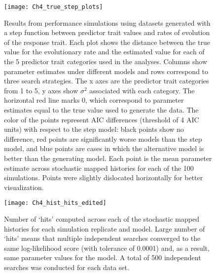\begin{figure}[hp]
	\centering
	\texttt{[image: Ch4\_true\_step\_plots]}
	\caption[Results from performance simulations using datasets generated with a step function between predictor trait values and rates of evolution of the response trait.]{Results from performance simulations using datasets generated with a step function between predictor trait values and rates of evolution of the response trait. Each plot shows the distance between the true value for the evolutionary rate and the estimated value for each of the 5 predictor trait categories used in the analyses. Columns show parameter estimates under different models and rows correspond to three search strategies. The x axes are the predictor trait categories from 1 to 5, y axes show $\sigma^{2}$ associated with each category. The horizontal red line marks 0, which correspond to parameter estimates equal to the true value used to generate the data. The color of the points represent AIC differences (threshold of 4 AIC units) with respect to the step model: black points show no difference, red points are significantly worse models than the step model, and blue points are cases in which the alternative model is better than the generating model. Each point is the mean parameter estimate across stochastic mapped histories for each of the 100 simulations. Points were slightly dislocated horizontally for better visualization.}
	\label{fig:chart_step}
\end{figure}

\begin{figure}[hp]
	\centering
	\texttt{[image: Ch4\_hist\_hits\_edited]}
	\caption[Number of `hits' computed across each of the stochastic mapped histories for each simulation replicate and model.]{Number of `hits' computed across each of the stochastic mapped histories for each simulation replicate and model. Large number of `hits' means that multiple independent searches converged to the same log-likelihood score (with tolerance of 0.0001) and, as a result, same parameter values for the model. A total of 500 independent searches was conducted for each data set.}
	\label{fig:hist_hits}
\end{figure}


